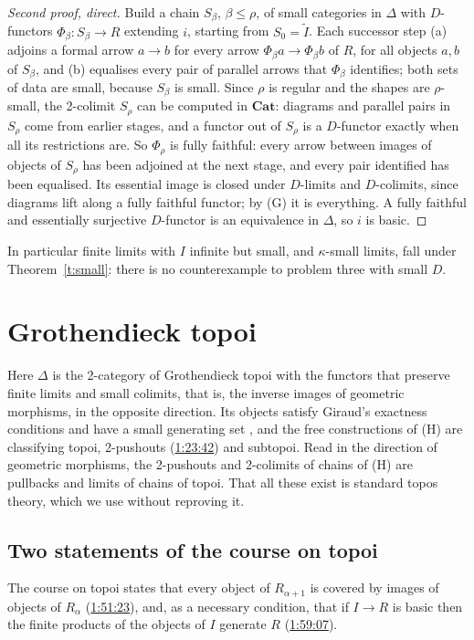 \documentclass[11pt,a4paper]{amsart}
\theoremstyle{definition}
\theoremstyle{remark}
\newcommand{\ts}[3]{\href{https://www.youtube.com/watch?v=#1&t=#2}{#3}}
\newcommand{\Cat}{\mathbf{Cat}}
\begin{document}
\begin{proof}[Second proof, direct]
Build a chain $S_\beta$, $\beta\le\rho$, of small categories in $\Delta$ with $D$-functors $\Phi_\beta\colon S_\beta\to R$ extending $i$, starting from $S_0=\widetilde I$. Each successor step (a) adjoins a formal arrow $a\to b$ for every arrow $\Phi_\beta a\to\Phi_\beta b$ of $R$, for all objects $a,b$ of $S_\beta$, and (b) equalises every pair of parallel arrows that $\Phi_\beta$ identifies; both sets of data are small, because $S_\beta$ is small. Since $\rho$ is regular and the shapes are $\rho$-small, the 2-colimit $S_\rho$ can be computed in $\Cat$: diagrams and parallel pairs in $S_\rho$ come from earlier stages, and a functor out of $S_\rho$ is a $D$-functor exactly when all its restrictions are. So $\Phi_\rho$ is fully faithful: every arrow between images of objects of $S_\rho$ has been adjoined at the next stage, and every pair identified has been equalised. Its essential image is closed under $D$-limits and $D$-colimits, since diagrams lift along a fully faithful functor; by (G) it is everything. A fully faithful and essentially surjective $D$-functor is an equivalence in $\Delta$, so $i$ is basic.
\end{proof}

In particular finite limits with $I$ infinite but small, and $\kappa$-small limits, fall under Theorem~\ref{t:small}: there is no counterexample to problem three with small $D$.

\section{Grothendieck topoi}\label{sec:topos}

Here $\Delta$ is the 2-category of Grothendieck topoi with the functors that preserve finite limits and small colimits, that is, the inverse images of geometric morphisms, in the opposite direction. Its objects satisfy Giraud's exactness conditions and have a small generating set \cite[exp.~IV]{sga4}, and the free constructions of (H) are classifying topoi, 2-pushouts (\ts{ORG14LNb5gE}{1h23m42s}{1:23:42}) and subtopoi. Read in the direction of geometric morphisms, the 2-pushouts and 2-colimits of chains of (H) are pullbacks and limits of chains of topoi. That all these exist is standard topos theory, which we use without reproving it.

\subsection{Two statements of the course on topoi}
The course on topoi states that every object of $R_{\alpha+1}$ is covered by images of objects of $R_\alpha$ (\ts{ORG14LNb5gE}{1h51m23s}{1:51:23}), and, as a necessary condition, that if $I\to R$ is basic then the finite products of the objects of $I$ generate $R$ (\ts{ORG14LNb5gE}{1h59m7s}{1:59:07}).
\end{document}
